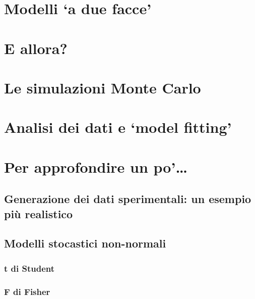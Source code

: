 \documentclass[a4paper,12pt,oneside]{book}
\begin{document}
\hypertarget{modelli-a-due-facce}{%
\section{Modelli `a due facce'}\label{modelli-a-due-facce}}

\hypertarget{e-allora}{%
\section{E allora?}\label{e-allora}}

\hypertarget{le-simulazioni-monte-carlo}{%
\section{Le simulazioni Monte Carlo}\label{le-simulazioni-monte-carlo}}

\hypertarget{analisi-dei-dati-e-model-fitting}{%
\section{Analisi dei dati e `model fitting'}\label{analisi-dei-dati-e-model-fitting}}

\hypertarget{per-approfondire-un-po-2}{%
\section{Per approfondire un po'\ldots{}}\label{per-approfondire-un-po-2}}

\hypertarget{generazione-dei-dati-sperimentali-un-esempio-piu-realistico}{%
\subsection{Generazione dei dati sperimentali: un esempio più realistico}\label{generazione-dei-dati-sperimentali-un-esempio-piu-realistico}}

\hypertarget{modelli-stocastici-non-normali}{%
\subsection{Modelli stocastici non-normali}\label{modelli-stocastici-non-normali}}

\hypertarget{t-di-student}{%
\subsubsection{t di Student}\label{t-di-student}}

\hypertarget{f-di-fisher}{%
\subsubsection{F di Fisher}\label{f-di-fisher}}
\end{document}
